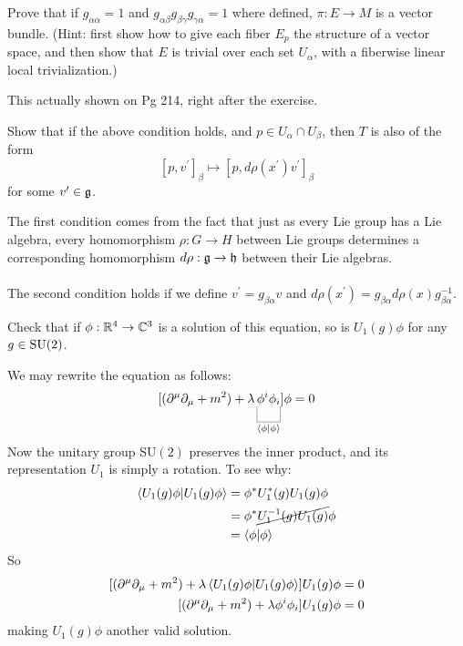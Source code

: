 \documentclass[10pt]{article}
\begin{document}
\begin{example}
	Prove that if $g_{\alpha\alpha} = 1$ and $g_{\alpha\beta}g_{\beta\gamma}g_{\gamma\alpha} = 1$ where defined, $\pi:E\to M$ is a vector bundle. (Hint: first show how to give each fiber $E_p$ the structure of a vector space, and then show that $E$ is trivial over each set $U_\alpha$, with a fiberwise linear local trivialization.)
\end{example}
\sol This actually shown on Pg 214, right after the exercise.


\begin{example}
	Show that if the above condition holds\mn{$$[p,v]_\alpha \mapsto [p,d\rho(x)v]_\alpha$$}, and $p \in U_\alpha \cap U_\beta$, then $T$ is also of the form
	$$
	[p,v^\prime]_\beta \mapsto [p,d\rho(x^\prime)v^\prime]_\beta
	$$
	for some $v^\prime \in \mathfrak{g}$.
\end{example}
\sol The first condition comes from the fact that just as every Lie group has a Lie algebra, every homomorphism $\rho:G\to H$ between Lie groups determines a corresponding homomorphism $d\rho:\mathfrak{g}\to \mathfrak{h}$ between their Lie algebras.\\\\
The second condition holds if we define $v^\prime = g_{\beta\alpha}v$ and $d\rho(x^\prime) = g_{\beta\alpha}d\rho(x)g_{\beta\alpha}^{-1}$.


\begin{example}
	Check that if $\phi:\mathbb{R}^4\to\mathbb{C}^3$ is a solution of this equation, so is $U_1(g)\phi$ for any $g\in\text{SU}(2)$.
\end{example}
\sol We may rewrite the equation as follows:
$$
\sparen{(\partial^\mu\partial_\mu+m^2) + \lambda \ub{\phi^i\phi_i}{\ip{\phi}}}\phi=0
$$
Now the unitary group SU$(2)$ preserves the inner product, and its representation $U_1$ is simply a rotation. To see why:
$$\begin{aligned}
	\ip{U_1(g)\phi}&=\phi^*U_1^*(g)U_1(g)\phi\\&=\phi^*\cancel{U_1^{-1}(g)U_1(g)}\phi\\&=\ip{\phi}
\end{aligned}
$$
So
$$
\begin{aligned}
	\sparen{(\partial^\mu\partial_\mu+m^2) + \lambda \ip{U_1(g)\phi}}U_1(g)\phi&=0\\
	\sparen{(\partial^\mu\partial_\mu+m^2) + \lambda \phi^i\phi_i}U_1(g)\phi&=0
\end{aligned}
$$
making $U_1(g)\phi$ another valid solution.
\end{document}
